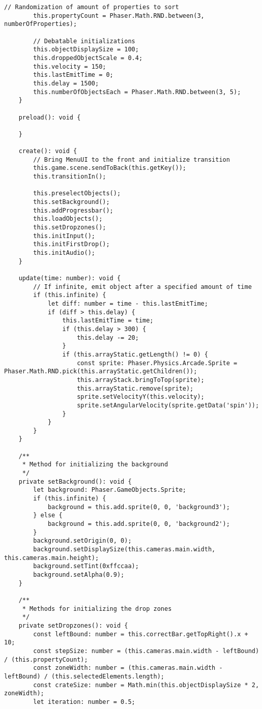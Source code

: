\begin{lstlisting}[style=TypeScript, caption={propertySortingScene.ts}]
        // Randomization of amount of properties to sort
        this.propertyCount = Phaser.Math.RND.between(3, numberOfProperties);

        // Debatable initializations
        this.objectDisplaySize = 100;
        this.droppedObjectScale = 0.4;
        this.velocity = 150;
        this.lastEmitTime = 0;
        this.delay = 1500;
        this.numberOfObjectsEach = Phaser.Math.RND.between(3, 5);
    }

    preload(): void {

    }

    create(): void {
        // Bring MenuUI to the front and initialize transition
        this.game.scene.sendToBack(this.getKey());
        this.transitionIn();

        this.preselectObjects();
        this.setBackground();
        this.addProgressbar();
        this.loadObjects();
        this.setDropzones();
        this.initInput();
        this.initFirstDrop();
        this.initAudio();
    }

    update(time: number): void {
        // If infinite, emit object after a specified amount of time
        if (this.infinite) {
            let diff: number = time - this.lastEmitTime;
            if (diff > this.delay) {
                this.lastEmitTime = time;
                if (this.delay > 300) {
                    this.delay -= 20;
                }
                if (this.arrayStatic.getLength() != 0) {
                    const sprite: Phaser.Physics.Arcade.Sprite = Phaser.Math.RND.pick(this.arrayStatic.getChildren());
                    this.arrayStack.bringToTop(sprite);
                    this.arrayStatic.remove(sprite);
                    sprite.setVelocityY(this.velocity);
                    sprite.setAngularVelocity(sprite.getData('spin'));
                }
            }
        }
    }

    /**
     * Method for initializing the background
     */
    private setBackground(): void {
        let background: Phaser.GameObjects.Sprite;
        if (this.infinite) {
            background = this.add.sprite(0, 0, 'background3');
        } else {
            background = this.add.sprite(0, 0, 'background2');
        }
        background.setOrigin(0, 0);
        background.setDisplaySize(this.cameras.main.width, this.cameras.main.height);
        background.setTint(0xffccaa);
        background.setAlpha(0.9);
    }

    /**
     * Methods for initializing the drop zones
     */
    private setDropzones(): void {
        const leftBound: number = this.correctBar.getTopRight().x + 10;
        const stepSize: number = (this.cameras.main.width - leftBound) / (this.propertyCount);
        const zoneWidth: number = (this.cameras.main.width - leftBound) / (this.selectedElements.length);
        const crateSize: number = Math.min(this.objectDisplaySize * 2, zoneWidth);
        let iteration: number = 0.5;


\end{lstlisting}

